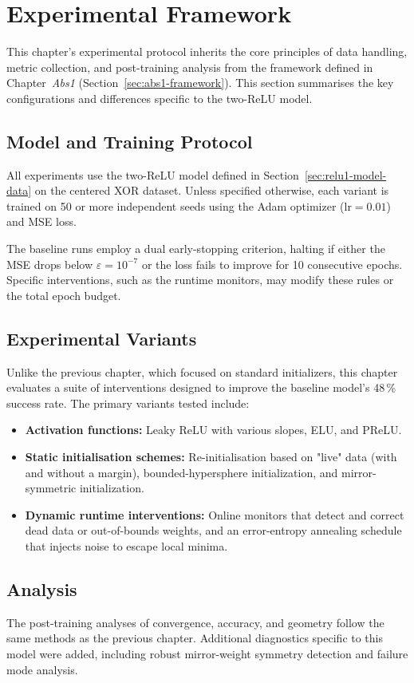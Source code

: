\section{Experimental Framework}
\label{sec:relu1-framework}

This chapter's experimental protocol inherits the core principles of data handling, metric collection, and post-training analysis from the framework defined in Chapter~\textit{Abs1} (Section~\ref{sec:abs1-framework}). This section summarises the key configurations and differences specific to the two-ReLU model.

\subsection*{Model and Training Protocol}
All experiments use the two-ReLU model defined in Section~\ref{sec:relu1-model-data} on the centered XOR dataset. Unless specified otherwise, each variant is trained on 50 or more independent seeds using the Adam optimizer ($\text{lr}=0.01$) and MSE loss.

The baseline runs employ a dual early-stopping criterion, halting if either the MSE drops below \(\varepsilon=10^{-7}\) or the loss fails to improve for 10 consecutive epochs. Specific interventions, such as the runtime monitors, may modify these rules or the total epoch budget.

\subsection*{Experimental Variants}
Unlike the previous chapter, which focused on standard initializers, this chapter evaluates a suite of interventions designed to improve the baseline model's 48\,\% success rate. The primary variants tested include:
\begin{itemize}
    \item \textbf{Activation functions:} Leaky ReLU with various slopes, ELU, and PReLU.
    \item \textbf{Static initialisation schemes:} Re-initialisation based on "live" data (with and without a margin), bounded-hypersphere initialization, and mirror-symmetric initialization.
    \item \textbf{Dynamic runtime interventions:} Online monitors that detect and correct dead data or out-of-bounds weights, and an error-entropy annealing schedule that injects noise to escape local minima.
\end{itemize}

\subsection*{Analysis}
The post-training analyses of convergence, accuracy, and geometry follow the same methods as the previous chapter. Additional diagnostics specific to this model were added, including robust mirror-weight symmetry detection and failure mode analysis.